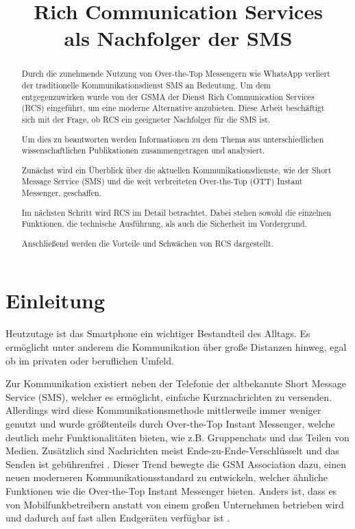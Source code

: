 \documentclass[conference]{IEEEtran}
\begin{document}
\title{Rich Communication Services\\als Nachfolger der SMS}

\author{
}

\maketitle

\begin{abstract}
    Durch die zunehmende Nutzung von Over-the-Top Messengern wie WhatsApp verliert der traditionelle Kommunikationsdienst SMS an Bedeutung.
    Um dem entgegenzuwirken wurde von der GSMA der Dienst Rich Communication Services (RCS) eingeführt, um eine moderne Alternative anzubieten.
    Diese Arbeit beschäftigt sich mit der Frage, ob RCS ein geeigneter Nachfolger für die SMS ist.

    Um dies zu beantworten werden Informationen zu dem Thema aus unterschiedlichen wissenschaftlichen Publikationen zusammengetragen und analysiert.

    Zunächst wird ein Überblick über die aktuellen Kommunikationsdienste, wie der Short Message Service (SMS) und die weit verbreiteten Over-the-Top (OTT) Instant Messenger, geschaffen.

    Im nächsten Schritt wird RCS im Detail betrachtet.
    Dabei stehen sowohl die einzelnen Funktionen, die technische Ausführung, als auch die Sicherheit im Vordergrund.

    Anschließend werden die Vorteile und Schwächen von RCS dargestellt.
\end{abstract}


\section{Einleitung}
Heutzutage ist das Smartphone ein wichtiger Bestandteil des Alltags.
Es ermöglicht unter anderem die Kommunikation über große Distanzen hinweg, egal ob im privaten oder beruflichen Umfeld.

Zur Kommunikation existiert neben der Telefonie der altbekannte Short Message Service (SMS), welcher es ermöglicht, einfache Kurznachrichten zu versenden.
Allerdings wird diese Kommunikationsmethode mittlerweile immer weniger genutzt und wurde größtenteils durch Over-the-Top Instant Messenger, welche deutlich mehr Funktionalitäten bieten, wie z.B. Gruppenchats und das Teilen von Medien.
Zusätzlich sind Nachrichten meist Ende-zu-Ende-Verschlüsselt und das Senden ist gebührenfrei \cite{ottmobinter}.
Dieser Trend bewegte die GSM Association dazu, einen neuen moderneren Kommunikationsstandard zu entwickeln, welcher ähnliche Funktionen wie die Over-the-Top Instant Messenger bieten.
Anders ist, dass es von Mobilfunkbetreibern anstatt von einem großen Unternehmen betrieben wird und dadurch auf fast allen Endgeräten verfügbar ist \cite{uniprof,rcsmno}.
\end{document}
